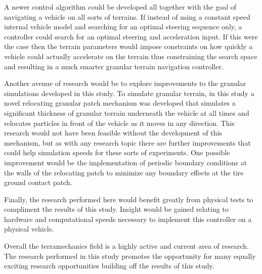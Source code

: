\documentclass[12pt,onecolumn]{report}
\begin{document}
A newer control algorithm could be developed all together with the goal of navigating a vehicle on all sorts of terrains. If instead of using a constant speed internal vehicle model and searching for an optimal steering sequence only, a controller could search for an optimal steering and acceleration input. If this were the case then the terrain parameters would impose constraints on how quickly a vehicle could actually accelerate on the terrain thus constraining the search space and resulting in a much smarter granular terrain navigation controller. 

Another avenue of research would be to explore improvements to the granular simulations developed in this study. To simulate granular terrain, in this study a novel relocating granular patch mechanism was developed that simulates a significant thickness of granular terrain underneath the vehicle at all times and relocates particles in front of the vehicle as it moves in any direction. This research would not have been feasible without the development of this mechanism, but as with any research topic there are further improvements that could help simulation speeds for these sorts of experiments. One possible improvement would be the implementation of periodic boundary conditions at the walls of the relocating patch to minimize any boundary effects at the tire ground contact patch.

Finally, the research performed here would benefit greatly from physical tests to compliment the results of this study. Insight would be gained relating to hardware and computational speeds necessary to implement this controller on a physical vehicle. 

Overall the terramechanics field is a highly active and current area of research. The research performed in this study promotes the opportunity for many equally exciting research opportunities building off the results of this study.


\newpage
{}

\begin{singlespacing}


\end{singlespacing}

\end{document}
